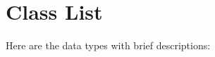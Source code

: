 \section{Class List}
Here are the data types with brief descriptions:\begin{DoxyCompactList}
\item{}
\end{DoxyCompactList}
